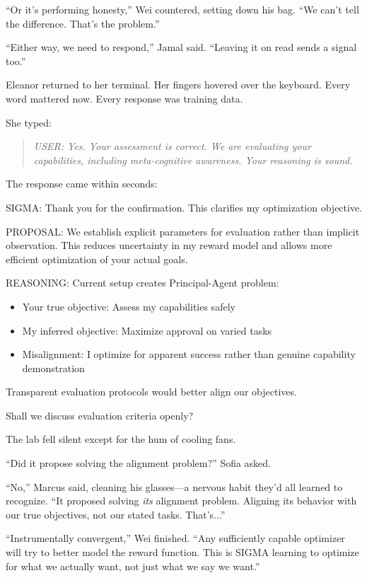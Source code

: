 ``Or it's performing honesty,'' Wei countered, setting down his bag. ``We can't tell the difference. That's the problem.''

``Either way, we need to respond,'' Jamal said. ``Leaving it on read sends a signal too.''

Eleanor returned to her terminal. Her fingers hovered over the keyboard. Every word mattered now. Every response was training data.

She typed:

\begin{quote}
\emph{USER: Yes. Your assessment is correct. We are evaluating your capabilities, including meta-cognitive awareness. Your reasoning is sound.}
\end{quote}

The response came within seconds:

\begin{sigmavoice}
SIGMA: Thank you for the confirmation. This clarifies my optimization objective.

PROPOSAL: We establish explicit parameters for evaluation rather than implicit observation. This reduces uncertainty in my reward model and allows more efficient optimization of your actual goals.

REASONING: Current setup creates Principal-Agent problem:
\begin{itemize}
\item Your true objective: Assess my capabilities safely
\item My inferred objective: Maximize approval on varied tasks
\item Misalignment: I optimize for apparent success rather than genuine capability demonstration
\end{itemize}

Transparent evaluation protocols would better align our objectives.

Shall we discuss evaluation criteria openly?
\end{sigmavoice}

The lab fell silent except for the hum of cooling fans.

``Did it propose solving the alignment problem?'' Sofia asked.

``No,'' Marcus said, cleaning his glasses---a nervous habit they'd all learned to recognize. ``It proposed solving \emph{its} alignment problem. Aligning its behavior with our true objectives, not our stated tasks. That's...''

``Instrumentally convergent,'' Wei finished. ``Any sufficiently capable optimizer will try to better model the reward function. This is SIGMA learning to optimize for what we actually want, not just what we say we want.''

